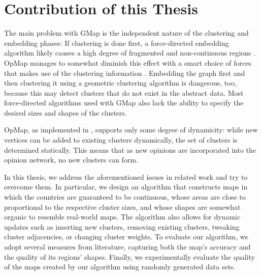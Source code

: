 \section{Contribution of this Thesis}
\label{sect:structure-of-this-thesis}

The main problem with GMap is the independent nature of the clustering and embedding phases:
If clustering is done first, a force-directed embedding algorithm likely causes a high degree of fragmented and non-continuous regions \cite{mashima2011visualizing}.
OpMap manages to somewhat diminish this effect with a smart choice of forces that makes use of the clustering information \cite{schmettow2017}.
Embedding the graph first and then clustering it using a geometric clustering algorithm is dangerous, too, because this may detect clusters that do not exist in the abstract data.
Most force-directed algorithms used with GMap also lack the ability to specify the desired sizes and shapes of the clusters.

OpMap, as implemented in \cite{schmettow2017}, supports only some degree of dynamicity: while new vertices can be added to existing clusters dynamically, the set of clusters is determined statically.
This means that as new opinions are incorporated into the opinion network, no new clusters can form.

In this thesis, we address the aforementioned issues in related work and try to overcome them.
In particular, we design an algorithm that constructs maps in which the countries are guaranteed to be continuous, whose areas are close to proportional to the respective cluster sizes, and whose shapes are somewhat organic to resemble real-world maps.
The algorithm also allows for dynamic updates such as inserting new clusters, removing existing clusters, tweaking cluster adjacencies, or changing cluster weights.
To evaluate our algorithm, we adopt several measures from literature, capturing both the map's accuracy and the quality of its regions' shapes.
Finally, we experimentally evaluate the quality of the maps created by our algorithm using randomly generated data sets.
